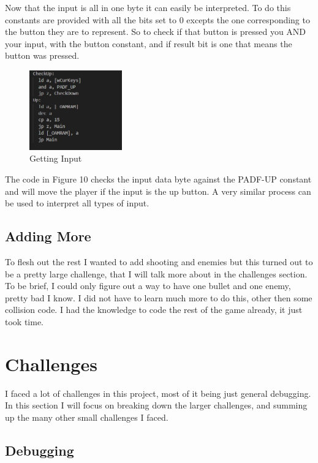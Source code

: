 \documentclass{article}
\begin{document}
Now that the input is all in one byte it can easily be interpreted. To do this constants are provided with all the bits set to 0 excepts the one corresponding to the button they are to represent. So to check if that button is pressed you AND your input, with the button constant, and if result bit is one that means the button was pressed. 

\begin{figure}[htp]
    \centering
    \includegraphics[width=4cm]{images/proccesingInput.JPG}
    \caption{Getting Input}
    \label{Procces Input}
\end{figure}

The code in Figure 10 checks the input data byte against the PADF-UP constant and will move the player if the input is the up button. A very similar process can be used to interpret all types of input. 

\subsection{Adding More}

To flesh out the rest I wanted to add shooting and enemies but this turned out to be a pretty large challenge, that I will talk more about in the challenges section. To be brief, I could only figure out a way to have one bullet and one enemy, pretty bad I know. I did not have to learn much more to do this, other then some collision code. I had the knowledge to code the rest of the game already, it just took time.

\section{Challenges}

I faced a lot of challenges in this project, most of it being just general debugging. In this section I will focus on breaking down the larger challenges, and summing up the many other small challenges I faced.

\subsection{Debugging}
\end{document}
